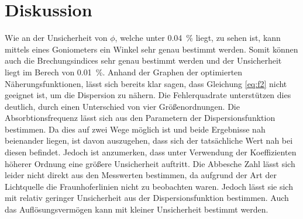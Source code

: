 \section{Diskussion}
\label{sec:Diskussion}
Wie an der Unsicherheit von $\phi$, welche unter \SI{0.04}{\percent} liegt, zu sehen ist, kann mittels eines Goniometers ein Winkel sehr genau bestimmt werden.
Somit können auch die Brechungsindices sehr genau bestimmt werden und der Unsicherheit liegt im Berech von \SI{0.01}{\percent}.
Anhand der Graphen der optimierten Näherungsfunktionen, lässt sich bereits klar sagen, dass Gleichung \eqref{eq:f2} nicht geeignet ist, um die Dispersion zu nähern.
Die Fehlerquadrate unterstützen dies deutlich, durch einen Unterschied von vier Größenordnungen.
Die Absorbtionsfrequenz lässt sich aus den Parametern der Dispersionsfunktion bestimmen. 
Da dies auf zwei Wege möglich ist und beide Ergebnisse nah beienander liegen, ist davon auszugehen, dass sich der tatsächliche Wert nah bei diesen befindet.
Jedoch ist anzumerken, dass unter Verwendung der Koeffizienten höherer Ordnung eine größere Unsicherheit auftritt.
Die Abbesche Zahl lässt sich leider nicht direkt aus den Messwerten bestimmen, da aufgrund der Art der Lichtquelle die Fraunhoferlinien nicht zu beobachten waren.
Jedoch lässt sie sich mit relativ geringer Unsicherheit aus der Dispersionsfunktion bestimmen.
Auch das Auflösungsvermögen kann mit kleiner Unsicherheit bestimmt werden.
